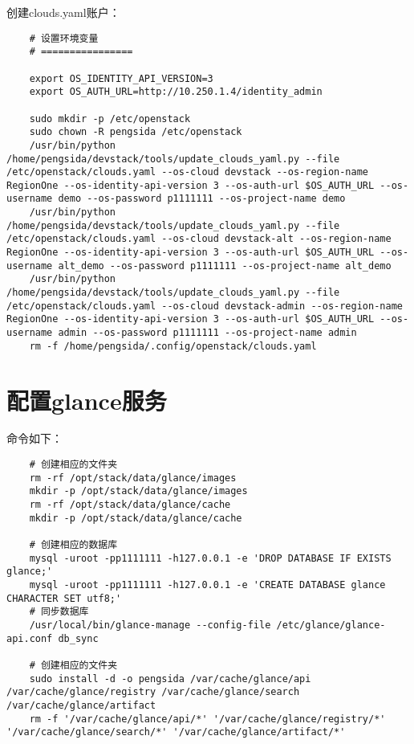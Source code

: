 \documentclass[a4paper,left=1.5cm,right=1.5cm,11pt]{article}
\begin{document}
	创建clouds.yaml账户：
	\begin{lstlisting}
	# 设置环境变量
	# ================

	export OS_IDENTITY_API_VERSION=3
    export OS_AUTH_URL=http://10.250.1.4/identity_admin

	sudo mkdir -p /etc/openstack
	sudo chown -R pengsida /etc/openstack
	/usr/bin/python /home/pengsida/devstack/tools/update_clouds_yaml.py --file /etc/openstack/clouds.yaml --os-cloud devstack --os-region-name RegionOne --os-identity-api-version 3 --os-auth-url $OS_AUTH_URL --os-username demo --os-password p1111111 --os-project-name demo
	/usr/bin/python /home/pengsida/devstack/tools/update_clouds_yaml.py --file /etc/openstack/clouds.yaml --os-cloud devstack-alt --os-region-name RegionOne --os-identity-api-version 3 --os-auth-url $OS_AUTH_URL --os-username alt_demo --os-password p1111111 --os-project-name alt_demo
	/usr/bin/python /home/pengsida/devstack/tools/update_clouds_yaml.py --file /etc/openstack/clouds.yaml --os-cloud devstack-admin --os-region-name RegionOne --os-identity-api-version 3 --os-auth-url $OS_AUTH_URL --os-username admin --os-password p1111111 --os-project-name admin
	rm -f /home/pengsida/.config/openstack/clouds.yaml
	\end{lstlisting}

\section{配置glance服务}
	命令如下：
	\begin{lstlisting}
	# 创建相应的文件夹
	rm -rf /opt/stack/data/glance/images
	mkdir -p /opt/stack/data/glance/images
	rm -rf /opt/stack/data/glance/cache
	mkdir -p /opt/stack/data/glance/cache

	# 创建相应的数据库
	mysql -uroot -pp1111111 -h127.0.0.1 -e 'DROP DATABASE IF EXISTS glance;'
	mysql -uroot -pp1111111 -h127.0.0.1 -e 'CREATE DATABASE glance CHARACTER SET utf8;'
	# 同步数据库
	/usr/local/bin/glance-manage --config-file /etc/glance/glance-api.conf db_sync

	# 创建相应的文件夹
	sudo install -d -o pengsida /var/cache/glance/api /var/cache/glance/registry /var/cache/glance/search /var/cache/glance/artifact
	rm -f '/var/cache/glance/api/*' '/var/cache/glance/registry/*' '/var/cache/glance/search/*' '/var/cache/glance/artifact/*'
	\end{lstlisting}
\end{document}
